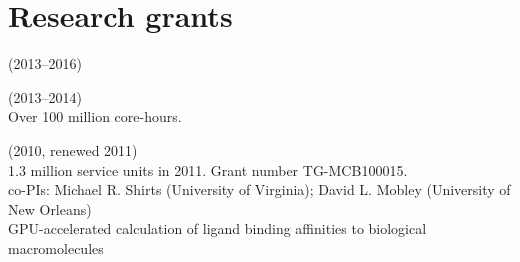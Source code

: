 \documentclass[10pt]{article}
\newcommand{\years}[1]{\marginpar{\quad \small #1}}
\begin{document}
%

\section*{Research grants}
 (2013--2016) 

 (2013--2014) \\
{\small Over 100 million core-hours.} 

 (2010, renewed 2011) \\
{\small 1.3 million service units in 2011. Grant number TG-MCB100015.} \\
{\small co-PIs: Michael R. Shirts (University of Virginia); David L. Mobley (University of New Orleans)} \\
{\small GPU-accelerated calculation of ligand binding affinities to biological macromolecules}
\end{document}
